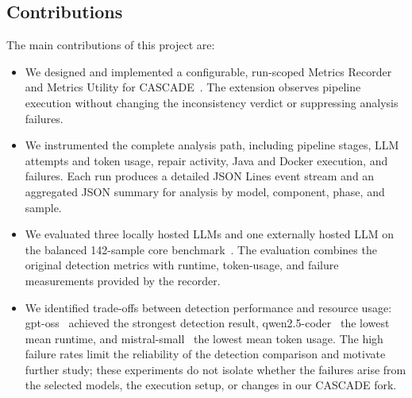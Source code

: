 \subsection{Contributions}
\label{sec:contributions}

The main contributions of this project are:
\begin{itemize}
    \item We designed and implemented a configurable, run-scoped Metrics
    Recorder and Metrics Utility for CASCADE~\cite{Kiecker_2026}. The extension observes pipeline
    execution without changing the inconsistency verdict or suppressing analysis
    failures.
    \item We instrumented the complete analysis path, including pipeline stages,
    LLM attempts and token usage, repair activity, Java and Docker execution, and
    failures. Each run produces a detailed JSON Lines event stream and an
    aggregated JSON summary for analysis by model, component, phase, and sample.
    \item We evaluated three locally hosted LLMs and one externally hosted LLM on
    the balanced 142-sample core benchmark~\cite{Kiecker_2026}. The evaluation combines the original
    detection metrics with runtime, token-usage, and failure measurements provided
    by the recorder.
    \item We identified trade-offs between detection performance and resource
    usage: gpt-oss~\cite{ollama_gpt_oss_20b} achieved the strongest detection
    result, qwen2.5-coder~\cite{ollama_qwen2.5-coder-14b-instruct} the lowest mean
    runtime, and mistral-small~\cite{ollama_mistral-small3.2_24b} the lowest mean
    token usage. The high
    failure rates limit the reliability of the detection comparison and motivate
    further study; these experiments do not isolate whether the failures arise
    from the selected models, the execution setup, or changes in our CASCADE fork.
\end{itemize}

